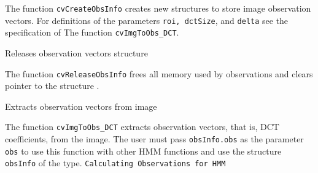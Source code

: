 {The function \texttt{cvCreateObsInfo} creates new structures to store image observation vectors. For definitions of the parameters \texttt{roi, dctSize}, and \texttt{delta} see the specification of The function \texttt{cvImgToObs\_DCT}.


Releases observation vectors structure


\begin{description}
\end{description}

The function \texttt{cvReleaseObsInfo} frees all memory used by observations and clears pointer to the structure .


Extracts observation vectors from image


\begin{description}
\end{description}

The function \texttt{cvImgToObs\_DCT} extracts observation vectors, that is, DCT coefficients, from the image. The user must pass \texttt{obsInfo.obs} as the parameter \texttt{obs} to use this function with other HMM functions and use the structure \texttt{obsInfo} of the  type.
\newline
\newline
\texttt{Calculating Observations for HMM}

}
